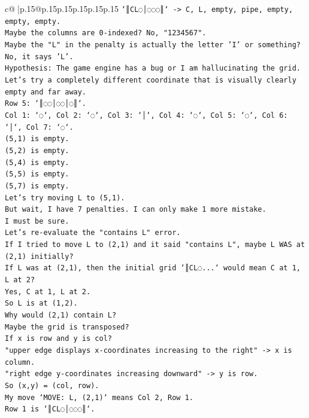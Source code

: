 \documentclass{article}
\begin{document}
{\begin{supertabular}{c@{$\;$}|p{.15\linewidth}@{}p{.15\linewidth}p{.15\linewidth}p{.15\linewidth}p{.15\linewidth}p{.15\linewidth}}
{{{\texttt{`║CL◌│◌◌◌║` {-}> C, L, empty, pipe, empty, empty, empty.} \\
\texttt{Maybe the columns are 0{-}indexed? No, "1234567".} \\
\texttt{Maybe the "L" in the penalty is actually the letter 'I' or something? No, it says 'L'.} \\
\texttt{Hypothesis: The game engine has a bug or I am hallucinating the grid.} \\
\texttt{Let's try a completely different coordinate that is visually clearly empty and far away.} \\
\texttt{Row 5: `║◌◌│◌◌│◌║`.} \\
\texttt{Col 1: `◌`, Col 2: `◌`, Col 3: `│`, Col 4: `◌`, Col 5: `◌`, Col 6: `│`, Col 7: `◌`.} \\
\texttt{(5,1) is empty.} \\
\texttt{(5,2) is empty.} \\
\texttt{(5,4) is empty.} \\
\texttt{(5,5) is empty.} \\
\texttt{(5,7) is empty.} \\
\texttt{Let's try moving L to (5,1).} \\
\texttt{But wait, I have 7 penalties. I can only make 1 more mistake.} \\
\texttt{I must be sure.} \\
\texttt{Let's re{-}evaluate the "contains L" error.} \\
\texttt{If I tried to move L to (2,1) and it said "contains L", maybe L WAS at (2,1) initially?} \\
\texttt{If L was at (2,1), then the initial grid `║CL◌...` would mean C at 1, L at 2?} \\
\texttt{Yes, C at 1, L at 2.} \\
\texttt{So L is at (1,2).} \\
\texttt{Why would (2,1) contain L?} \\
\texttt{Maybe the grid is transposed?} \\
\texttt{If x is row and y is col?} \\
\texttt{"upper edge displays x{-}coordinates increasing to the right" {-}> x is column.} \\
\texttt{"right edge y{-}coordinates increasing downward" {-}> y is row.} \\
\texttt{So (x,y) = (col, row).} \\
\texttt{My move `MOVE: L, (2,1)` means Col 2, Row 1.} \\
\texttt{Row 1 is `║CL◌│◌◌◌║`.} \\
}}}
\end{supertabular}}
\end{document}
